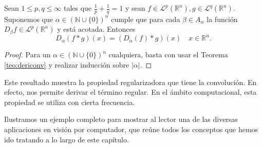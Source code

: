 \begin{teorema}
 Sean $1\leq p, q \leq \infty$ tales que $\frac{1}{p}+\frac{1}{q}=1$ y sean $f \in \mathscr{L}^p(\mathbb{R}^n), g \in \mathscr{L}^q(\mathbb{R}^n)$. Suponemos que  $\alpha \in (\mathbb{N} \cup \{0\})^n$ cumple que para cada $\beta \in A_{\alpha}$ la función $D_{\beta}f \in \mathscr{L}^p(\mathbb{R}^n)$ y está acotada. Entonces
\begin{equation}
    D_{\alpha}(f*g) (x)=  \left(D_{\alpha}(f)*g\right) (x) \quad  x \in \mathbb{R}^n.
\end{equation}
\end{teorema}

\begin{proof}
     Para un $\alpha \in ( \mathbb{N} \cup \{0\})^n$ cualquiera, basta con usar el Teorema \ref{teo:dericonv} y realizar inducción sobre $|\alpha|$.
\end{proof}



\noindent Este resultado muestra la propiedad regularizadora que tiene la convolución. En efecto, nos permite derivar el término regular.
\noindent En el ámbito computacional, esta propiedad se utiliza con cierta frecuencia. 

\noindent Ilustramos un ejemplo completo para mostrar al lector una de las diversas aplicaciones en visión por computador, que reúne todos los conceptos que hemos ido tratando a lo largo de este capítulo. 



